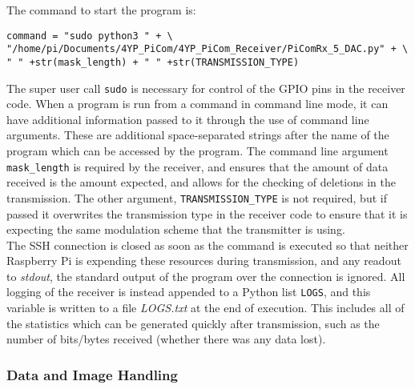 \documentclass[../main.tex]{subfiles}
\begin{document}
The command to start the program is:

\begin{lstlisting}[caption=Command Line to Start the Receiver]
command = "sudo python3 " + \
"/home/pi/Documents/4YP_PiCom/4YP_PiCom_Receiver/PiComRx_5_DAC.py" + \
" " +str(mask_length) + " " +str(TRANSMISSION_TYPE)
\end{lstlisting}

The super user call \colorbox{backcolour}{\lstinline{sudo}} is necessary for control of the GPIO pins in the receiver code.
When a program is run from a command in command line mode, it can have additional information passed to it through the use of command line arguments.
These are additional space-separated strings after the name of the program which can be accessed by the program.
The command line argument \colorbox{backcolour}{\lstinline{mask_length}} is required by the receiver, and ensures that the amount of data received is the amount expected, and allows for the checking of deletions in the transmission.
The other argument, \colorbox{backcolour}{\lstinline{TRANSMISSION_TYPE}} is not required, but if passed it overwrites the transmission type in the receiver code to ensure that it is expecting the same modulation scheme that the transmitter is using.\\

The SSH connection is closed as soon as the command is executed so that neither Raspberry Pi is expending these resources during transmission, and any readout to \textit{stdout}, the standard output of the program over the connection is ignored.
All logging of the receiver is instead appended to a Python list \colorbox{backcolour}{\lstinline{LOGS}}, and this variable is written to a file \textit{LOGS.txt} at the end of execution.
This includes all of the statistics which can be generated quickly after transmission, such as the number of bits/bytes received (whether there was any data lost).

\subsubsection{Data and Image Handling}
\end{document}
